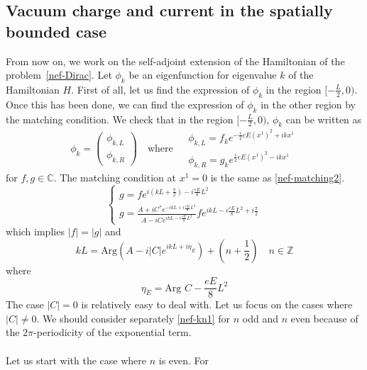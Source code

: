 \subsection{Vacuum charge and current in the spatially bounded case}
From now on, we work on the self-adjoint extension of the Hamiltonian of the problem~\cref{nef-Dirac}.
Let $\phi_k$ be an eigenfunction for eigenvalue $k$ of the Hamiltonian $H$. 
First of all, 
let us find the expression of $\phi_k$ in the region $[-\frac{L}{2}, 0)$.
Once this has been done, 
we can find the expression of $\phi_k$ in the other region by the matching condition.
We check that in the region $[-\frac{L}{2}, 0)$, 
$\phi_k$ can be written as 
\begin{equation}\label{nef-boundCond}
\phi_k =\begin{pmatrix}
\phi_{k,L}  \\
\phi_{k,R}
\end{pmatrix} 
\quad \textrm{where $\begin{split} 
 & \phi_{k,L} = f_k e^{-\frac{i}{2}eE(x^1)^2 + ikx^1} \\
& \phi_{k,R} = g_k e^{\frac{i}{2}eE(x^1)^2 - ikx^1}
\end{split}
$}
\end{equation}
for $f, g\in \mathbb{C}$. 
The matching condition at $x^1 = 0$ is the same as \cref{nef-matching2}. 
\begin{equation}
\begin{cases}
g = fe^{i(kL + \frac{\pi}{2}) - i\frac{eE}{8}L^2}  \\
g = \frac{A + iC^* e^{-ikL + i\frac{eE}{8}L^2 }}{A - iC e^{ikL - i\frac{eE}{8}L^2}} fe^{ikL - i\frac{eE}{8}L^2 + i\frac{\pi}{2}}
\end{cases}
\end{equation}
which implies $|f| = |g|$ and
\begin{equation}\label{nef-kn1}
kL = \textrm{Arg}(A - i|C| e^{ikL + i\eta_E}) + (n + \frac{1}{2}) \quad n\in \mathbb{Z}
\end{equation}
where
\begin{equation*}
\eta_E = \textrm{Arg } C - \frac{eE}{8}L^2 
\end{equation*}
The case $|C| =0$ is relatively easy to deal with. Let us focus on the cases where $|C| \neq 0$. We should consider separately \cref{nef-kn1} for $n$ odd and $n$ even because of the $2\pi$-periodicity of the exponential term. \\\\
Let us start with the case where $n$ is even. 
For 
